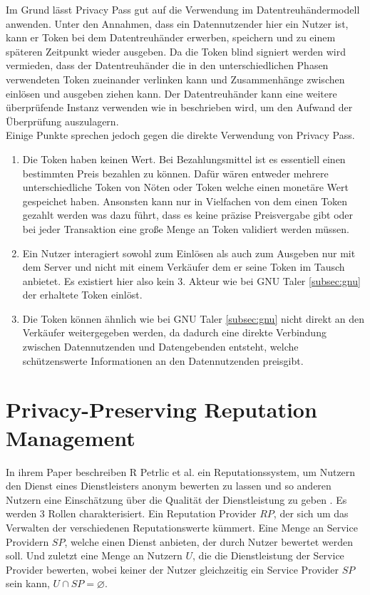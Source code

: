 \documentclass[11pt,a4paper]{scrreprt}
\begin{document}
Im Grund lässt Privacy Pass gut auf die Verwendung im Datentreuhändermodell anwenden. Unter den Annahmen, dass ein Datennutzender hier ein Nutzer ist, kann er Token bei dem Datentreuhänder erwerben, speichern und zu einem späteren Zeitpunkt wieder ausgeben. Da die Token blind signiert werden wird vermieden, dass der Datentreuhänder die in den unterschiedlichen Phasen verwendeten Token zueinander verlinken kann und Zusammenhänge zwischen einlösen und ausgeben ziehen kann. Der Datentreuhänder kann eine weitere überprüfende Instanz verwenden wie in \cite{pp-davidson2018privacy} beschrieben wird, um den Aufwand der Überprüfung auszulagern. \\
Einige Punkte sprechen jedoch gegen die direkte Verwendung von Privacy Pass. 
\begin{enumerate}
    \item Die Token haben keinen Wert. Bei Bezahlungsmittel ist es essentiell einen bestimmten Preis bezahlen zu können. Dafür wären entweder mehrere unterschiedliche Token von Nöten oder Token welche einen monetäre Wert gespeichet haben. Ansonsten kann nur in Vielfachen von dem einen Token gezahlt werden was dazu führt, dass es keine präzise Preisvergabe gibt oder bei jeder Transaktion eine große Menge an Token validiert werden müssen.
    \item Ein Nutzer interagiert sowohl zum Einlösen als auch zum Ausgeben nur mit dem Server und nicht mit einem Verkäufer dem er seine Token im Tausch anbietet. Es existiert hier also kein 3. Akteur wie bei GNU Taler \ref{subsec:gnu} der erhaltete Token einlöst.
    \item Die Token können ähnlich wie bei GNU Taler \ref{subsec:gnu} nicht direkt an den Verkäufer weitergegeben werden, da dadurch eine direkte Verbindung zwischen Datennutzenden und Datengebenden entsteht, welche schützenswerte Informationen an den Datennutzenden preisgibt.
\end{enumerate}

\section{Privacy-Preserving Reputation Management}
\label{subsec:rep}
In ihrem Paper beschreiben R Petrlic et al. ein Reputationssystem, um Nutzern den Dienst eines Dienstleisters anonym bewerten zu lassen und so anderen Nutzern eine Einschätzung über die Qualität der Dienstleistung zu geben \cite{petrlic2014privacy}. Es werden 3 Rollen charakterisiert. Ein Reputation Provider $RP$, der sich um das Verwalten der verschiedenen Reputationswerte kümmert. Eine Menge an Service Providern $SP$, welche einen Dienst anbieten, der durch Nutzer bewertet werden soll. Und zuletzt eine Menge an Nutzern $U$, die die Dienstleistung der Service Provider bewerten, wobei keiner der Nutzer gleichzeitig ein Service Provider $SP$ sein kann, $U \cap SP = \varnothing$. 
\end{document}
